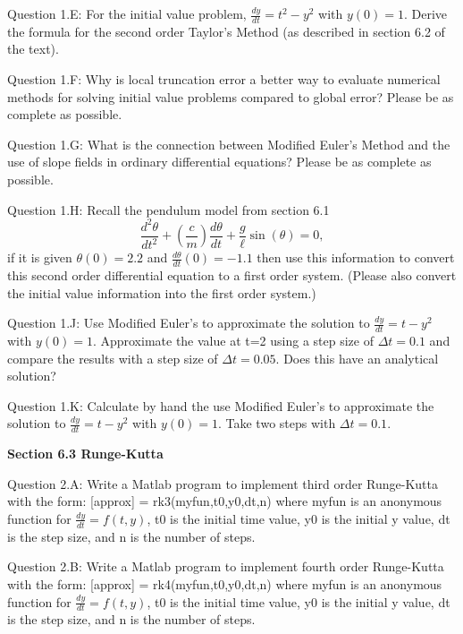 \documentclass{article}
\def\ds{\displaystyle}
\begin{document}
\medskip \par \noindent
%
Question 1.E: For the initial value problem, $\ds \frac {dy}{dt} = t^2-y^2$ with $\ds y(0)=1$. Derive the formula for the second order Taylor's Method (as described in section 6.2 of the text).  
\medskip \par \noindent
%
Question 1.F: Why is local truncation error a better way to evaluate numerical methods for solving initial value problems compared to global error? Please be as complete as possible. 
\medskip \par \noindent
%
Question 1.G: What is the connection between Modified Euler's Method and the use of slope fields in ordinary differential equations? Please be as complete as possible. 
\medskip \par \noindent
%
Question 1.H: Recall the pendulum model from section 6.1
$$\frac {d^2 \theta}{dt^2} + \left (\frac cm\right )\frac {d\theta}{dt} + \frac g{\ell} \sin (\theta) = 0,$$
if it is given $\ds \theta (0)=2.2$ and $\ds \frac {d\theta}{dt}(0)=-1.1$ then use this information to convert this second order differential equation to a first order system. (Please also convert the initial value information into the first order system.) 
\medskip \par \noindent
%
Question 1.J: Use Modified Euler's to approximate the solution to $\ds \frac {dy}{dt}=t-y^2$ with $y(0)=1$. Approximate the value at t=2 using a step size of $\ds \Delta t=0.1$ and compare the results with a step size of $\ds \Delta t=0.05$. Does this have an analytical solution?
\par \medskip \noindent
Question 1.K: Calculate by hand the use Modified Euler's to approximate the solution to $\ds \frac {dy}{dt}=t-y^2$ with $y(0)=1$. Take two steps with $\ds \Delta t = 0.1$.
\par \bigskip \par
{\bf Section 6.3 Runge-Kutta} \\
\medskip \par \noindent
%
Question 2.A: Write a Matlab program to implement third order Runge-Kutta with the form: [approx] = rk3(myfun,t0,y0,dt,n) where myfun is an anonymous function for $\ds \frac {dy}{dt}=f(t,y)$, t0 is the initial time value, y0 is the initial y value, dt is the step size, and n is the number of steps. 

 \medskip \par \noindent
%
Question 2.B: Write a Matlab program to implement fourth order Runge-Kutta with the form: [approx] = rk4(myfun,t0,y0,dt,n) where myfun is an anonymous function for $\ds \frac {dy}{dt}=f(t,y)$, t0 is the initial time value, y0 is the initial y value, dt is the step size, and n is the number of steps. 
\end{document}
